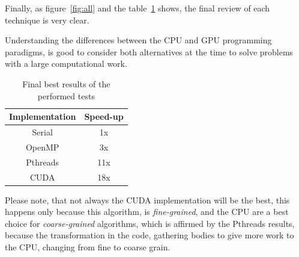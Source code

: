 Finally, as figure~\ref{fig:all} and the table~\ref{tab:all} shows,
the final review of each technique is very clear.

Understanding the differences between the CPU and GPU
programming paradigms, is good to consider both alternatives
at the time to solve problems with a large computational work.

\begin{table}[h!t]
    \centering
    \begin{tabular}{|c|c|}
        \hline
        \textbf{Implementation} & \textbf{Speed-up} \\\hline
        Serial  & 1x  \\\hline
        OpenMP  & 3x  \\\hline
        Pthreads & 11x \\\hline
        CUDA    & 18x \\\hline
    \end{tabular}
    \label{tab:all}
    \caption{Final best results of the performed tests}
\end{table}

Please note, that not always the CUDA implementation
will be the best, this happens only because this algorithm,
is \emph{fine-grained}, and the CPU are a best choice for
\emph{coarse-grained} algorithms, which is affirmed
by the Pthreads results, because the transformation
in the code, gathering bodies to give more work to the CPU,
changing from fine to coarse grain.
